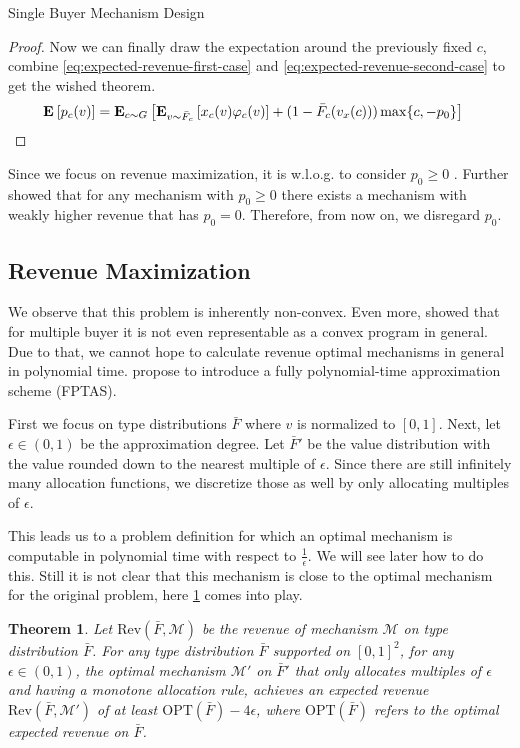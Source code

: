 \documentclass[11pt,a4paper]{article}
\newtheorem{theorem}{Theorem}
\newcommand{\Ex}[2][]{\mbox{\rm\bf E}_{#1}\left[#2\right]}
\newcommand{\1}[1]{\mbox{\rm\bf 1}_{#1}}
\begin{document}
\begin{section}{Single Buyer Mechanism Design}
\begin{proof}
     Now we can finally draw the expectation around the previously fixed $c$, combine \cref{eq:expected-revenue-first-case} and \cref{eq:expected-revenue-second-case} to get the wished theorem.
     \begin{align*}
         \Ex{p_c(v)} & = \Ex[c \sim G]{\Ex[v \sim \bar{F}_c]{x_c(v) \varphi_c(v)} + (1 - \bar{F}_{c}(v_x(c))) \max\{c, -p_0\} }
     \end{align*}
 \end{proof}

 Since we focus on revenue maximization, it is w.l.o.g. to consider $p_0 \geq 0$ \cite{primary}.
 Further \citet{primary} showed that for any mechanism with $p_0 \geq 0$ there exists a mechanism with weakly higher revenue that has $p_0 = 0$.
 Therefore, from now on, we disregard $p_0$.

 \subsection{Revenue Maximization}
 \label{sec:revenue-maximization}

 We observe that this problem is inherently non-convex.
 Even more, \citet{primary} showed that for multiple buyer it is not even representable as a convex program in general.
 Due to that, we cannot hope to calculate revenue optimal mechanisms in general in polynomial time.
 \citet{primary} propose to introduce a fully polynomial-time approximation scheme (FPTAS).

 First we focus on type distributions $\bar{F}$ where $v$ is normalized to $[0,1]$.
 Next, let $\epsilon \in (0, 1)$ be the approximation degree.
 Let $\bar{F}'$ be the value distribution with the value rounded down to the nearest multiple of $\epsilon$.
 Since there are still infinitely many allocation functions, we discretize those as well by only allocating multiples of $\epsilon$.

 This leads us to a problem definition for which an optimal mechanism is computable in polynomial time with respect to $\frac{1}{\epsilon}$.
 We will see later how to do this.
 Still it is not clear that this mechanism is close to the optimal mechanism for the original problem, here \cref{theorem:approximation-guarantee} comes into play.

 \begin{theorem}
     \label{theorem:approximation-guarantee}
     Let $\mathrm{Rev}(\bar{F}, \mathcal{M})$ be the revenue of mechanism $\mathcal{M}$ on type distribution $\bar{F}$.
     For any type distribution $\bar{F}$ supported on $[0,1]^2$, for any $\epsilon \in (0,1)$,
     the optimal mechanism $\mathcal{M}'$ on $\bar{F}'$ that only allocates multiples of $\epsilon$ and having a monotone allocation rule, achieves an expected revenue $\mathrm{Rev}(\bar{F},\mathcal{M}')$ of at least
     $\mathrm{OPT}(\bar{F}) - 4\epsilon$, where $\mathrm{OPT}(\bar{F})$ refers to the optimal expected revenue on $\bar{F}$.
 \end{theorem}


\end{section}
\end{document}
